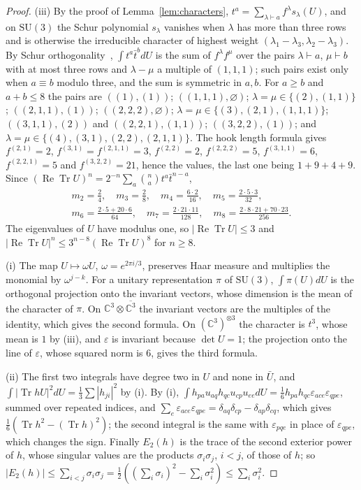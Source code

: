 \documentclass[aps,prd,twocolumn,superscriptaddress,nofootinbib,longbibliography,floatfix,amsmath,amssymb,10pt]{revtex4-2}
\theoremstyle{definition}
\theoremstyle{remark}
\newcommand{\C}{\mathbb{C}}
\newcommand{\SU}{\mathrm{SU}}
\newcommand{\Tr}{\operatorname{Tr}}
\newcommand{\ReTr}{\operatorname{Re}\operatorname{Tr}}
\begin{document}
\begin{proof}
(iii) By the proof of Lemma~\ref{lem:characters}, $t^a=\sum_{\lambda\vdash
a}f^\lambda s_\lambda(U)$, and on $\SU(3)$ the Schur polynomial $s_\lambda$
vanishes when $\lambda$ has more than three rows and is otherwise the
irreducible character of highest weight $(\lambda_1-\lambda_3,\lambda_2-
\lambda_3)$. By Schur orthogonality~\cite[Ch.~2]{Bum13}, $\int t^a\bar
t^bdU$ is the sum of $f^\lambda f^\mu$ over the pairs $\lambda\vdash a$,
$\mu\vdash b$ with at most three rows and $\lambda-\mu$ a multiple of
$(1,1,1)$; such pairs exist only when $a\equiv b$ modulo three, and the sum
is symmetric in $a,b$. For $a\ge b$ and $a+b\le8$ the pairs are
$((1),(1))$; $((1,1,1),\varnothing)$; $\lambda=\mu\in\{(2),(1,1)\}$;
$((2,1,1),(1))$; $((2,2,2),\varnothing)$; $\lambda=\mu\in\{(3),(2,1),
(1,1,1)\}$; $((3,1,1),(2))$ and $((2,2,1),(1,1))$; $((3,2,2),(1))$; and
$\lambda=\mu\in\{(4),(3,1),(2,2),(2,1,1)\}$. The hook length formula gives
$f^{(2,1)}=2$, $f^{(3,1)}=f^{(2,1,1)}=3$, $f^{(2,2)}=2$, $f^{(2,2,2)}=5$,
$f^{(3,1,1)}=6$, $f^{(2,2,1)}=5$ and $f^{(3,2,2)}=21$, hence the values, the
last one being $1+9+4+9$. Since $(\ReTr U)^n=2^{-n}\sum_a\binom nat^a\bar
t^{n-a}$,
\begin{gather*}
m_2=\tfrac{2}{4},\quad m_3=\tfrac28,\quad m_4=\tfrac{6\cdot2}{16},\quad
m_5=\tfrac{2\cdot5\cdot3}{32},\\
m_6=\tfrac{2\cdot5+20\cdot6}{64},\quad m_7=\tfrac{2\cdot21\cdot11}{128},
\quad m_8=\tfrac{2\cdot8\cdot21+70\cdot23}{256}.
\end{gather*}
The eigenvalues of $U$ have modulus one, so $|\ReTr U|\le3$ and
$|\ReTr U|^n\le3^{n-8}(\ReTr U)^8$ for $n\ge8$.

(i) The map $U\mapsto\omega U$, $\omega=e^{2\pi i/3}$, preserves Haar
measure and multiplies the monomial by $\omega^{j-k}$. For a unitary
representation $\pi$ of $\SU(3)$, $\int\pi(U)dU$ is the orthogonal
projection onto the invariant vectors, whose dimension is the mean of the
character of $\pi$. On $\C^3\otimes\overline{\C^3}$ the invariant vectors
are the multiples of the identity, which gives the second formula. On
$(\C^3)^{\otimes3}$ the character is $t^3$, whose mean is $1$ by (iii), and
$\varepsilon$ is invariant because $\det U=1$; the projection onto the line
of $\varepsilon$, whose squared norm is $6$, gives the third formula.

(ii) The first two integrals have degree two in $U$ and none in $\bar U$,
and $\int|\Tr hU|^2dU=\frac13\sum|h_{ji}|^2$ by (i). By (i),
$\int h_{pa}u_{aq}h_{qc}u_{cp}u_{ee}dU=\frac16h_{pa}h_{qc}\varepsilon_{ace}
\varepsilon_{qpe}$, summed over repeated indices, and $\sum_e
\varepsilon_{ace}\varepsilon_{qpe}=\delta_{aq}\delta_{cp}-\delta_{ap}
\delta_{cq}$, which gives $\frac16(\Tr h^2-(\Tr h)^2)$; the second integral
is the same with $\varepsilon_{pqe}$ in place of $\varepsilon_{qpe}$, which
changes the sign. Finally $E_2(h)$ is the trace of the second exterior power
of $h$, whose singular values are the products $\sigma_i\sigma_j$, $i<j$, of
those of $h$; so $|E_2(h)|\le\sum_{i<j}\sigma_i\sigma_j=\frac12((\sum_i
\sigma_i)^2-\sum_i\sigma_i^2)\le\sum_i\sigma_i^2$.
\end{proof}
\end{document}
